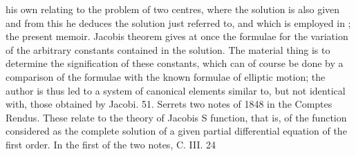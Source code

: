 \documentclass[12pt,a4paper]{article}
\theoremstyle{definition}
\begin{document}
his own relating to the problem of two centres, where the solution is also given and
from this he deduces the solution just referred to, and which is employed in ; the
present memoir. Jacobis theorem gives at once the formulae for the variation of the
arbitrary constants contained in the solution. The material thing is to determine the
signification of these constants, which can of course be done by a comparison of the
formulae with the known formulae of elliptic motion; the author is thus led to a
system of canonical elements similar to, but not identical with, those obtained by
Jacobi.
51. Serrets two notes of 1848 in the Comptes Rendus. These relate to the theory
of Jacobis S function, that is, of the function considered as the complete solution of
a given partial differential equation of the first order. In the first of the two notes,
C. III. 24


\end{document}
